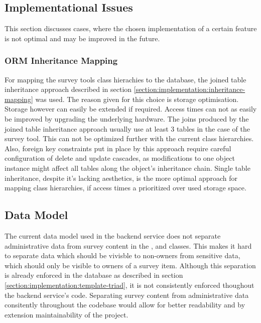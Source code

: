     \subsection{Implementational Issues}
    	This section discusses cases, where the chosen implementation
    	of a certain feature is not optimal and may be improved in the
    	future.

    	\subsubsection{ORM Inheritance Mapping}
    		For mapping the survey tools class hierachies to the database,
    		the joined table inheritance approach described in section
    		\ref{section:implementation:inheritance-mapping} was used.
    		The reason given for this choice is storage optimisation.
    		Storage however can easily be extended if required.
    		Access times can not as easily be improved by upgrading the
    		underlying hardware. The joins produced by the joined table
    		inheritance approach usually use at least 3 tables in the
    		case of the survey tool. This can not be optimized further
    		with the current class hierarchies. Also, foreign key
    		constraints put in place by this approach require
    		careful configuration of delete and update cascades,
    		as modifications to one object instance might affect
    		all tables along the object's inheritance chain.
    		Single table inheritance, despite it's lacking aesthetics,
    		is the more optimal approach for mapping class hierarchies,
    		if access times a prioritized over used storage space.

    	\subsection{Data Model}
    		The current data model used in the backend service does
    		not separate administrative data from survey content
    		in the ,  and
    		 classes. This makes it hard to separate
    		data which should be vivisble to non-owners from
    		sensitive data, which should only be visible to owners
    		of a survey item. Although this separation is already
    		enforced in the database as described in section \ref{section:implementation:template-triad},
    		it is not consistently enforced thoughout the backend service's
    		code. Separating survey content from administrative
    		data consitently throughout the codebase would
    		allow for better readability and by extension
    		maintainability of the project.

